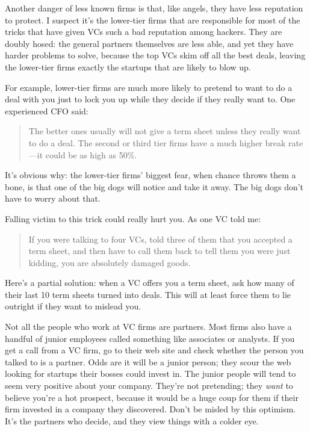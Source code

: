 Another danger of less known firms is that, like angels, they have less
reputation to protect. I suspect it's the lower-tier firms that are
responsible for most of the tricks that have given VCs such a bad
reputation among hackers. They are doubly hosed: the general partners
themselves are less able, and yet they have harder problems to solve,
because the top VCs skim off all the best deals, leaving the lower-tier
firms exactly the startups that are likely to blow up.

For example, lower-tier firms are much more likely to pretend to want to
do a deal with you just to lock you up while they decide if they really
want to. One experienced CFO said:

\begin{quote}
The better ones usually will not give a term sheet unless they really
want to do a deal. The second or third tier firms have a much higher
break rate---it could be as high as 50\%.
\end{quote}

It's obvious why: the lower-tier firms' biggest fear, when chance throws
them a bone, is that one of the big dogs will notice and take it away.
The big dogs don't have to worry about that.

Falling victim to this trick could really hurt you. As one VC told me:

\begin{quote}
If you were talking to four VCs, told three of them that you accepted a
term sheet, and then have to call them back to tell them you were just
kidding, you are absolutely damaged goods.
\end{quote}

Here's a partial solution: when a VC offers you a term sheet, ask how
many of their last 10 term sheets turned into deals. This will at least
force them to lie outright if they want to mislead you.

Not all the people who work at VC firms are partners. Most firms also
have a handful of junior employees called something like associates or
analysts. If you get a call from a VC firm, go to their web site and
check whether the person you talked to is a partner. Odds are it will be
a junior person; they scour the web looking for startups their bosses
could invest in. The junior people will tend to seem very positive about
your company. They're not pretending; they \emph{want} to believe you're
a hot prospect, because it would be a huge coup for them if their firm
invested in a company they discovered. Don't be misled by this optimism.
It's the partners who decide, and they view things with a colder eye.


